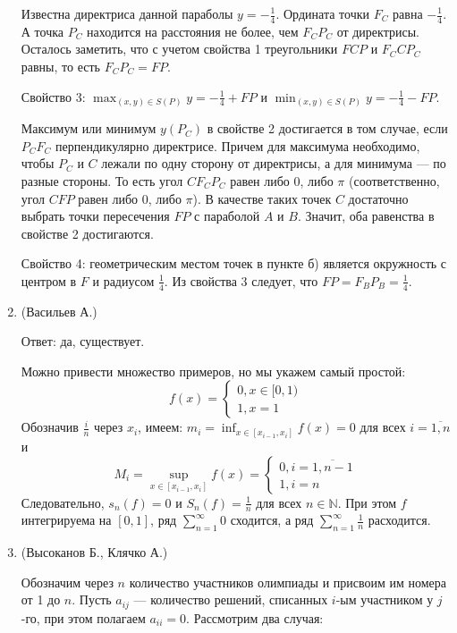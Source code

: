 \documentclass[12pt, a4paper]{article}
\begin{document}
\begin{enumerate}
Известна директриса данной параболы $y = -\frac{1}{4}$. Ордината точки $F_C$ равна $-\frac{1}{4}$. А точка $P_C$ находится на расстояния не более, чем $F_CP_C$ от директрисы. Осталось заметить, что с учетом свойства 1 треугольники $FCP$ и $F_CCP_C$ равны, то есть $F_CP_C = FP$.

Свойство 3:  $\displaystyle \max_{(x, y) \in S(P)} y = -\frac{1}{4} + FP$ и $\displaystyle \min_{(x, y) \in S(P)} y = -\frac{1}{4} - FP$. 

Максимум или минимум $y(P_C)$ в свойстве 2 достигается в том случае, если $P_CF_C$ перпендикулярно директрисе. Причем для максимума необходимо, чтобы $P_C$ и $C$ лежали по одну сторону от директрисы, а для минимума --- по разные стороны. То есть угол $CF_CP_C$ равен либо 0, либо $\pi$ (соответственно, угол $CFP$ равен либо 0, либо $\pi$). В качестве таких точек $C$ достаточно выбрать точки  пересечения $FP$ с параболой $A$ и $B$. Значит, оба равенства в свойстве 2 достигаются.

Свойство 4: геометрическим местом точек в пункте б) является окружность с центром в $F$ и радиусом $\frac{1}{4}$. Из свойства 3 следует, что $FP = F_BP_B = \frac{1}{4}$.

\item (Васильев А.)

Ответ: да, существует.

Можно привести множество примеров, но мы укажем самый простой:
$$
f(x) =
\begin{cases}
0, x \in [0, 1)\\
1, x = 1
\end{cases}
$$
Обозначив $\frac{i}{n}$ через $x_i$, имеем: $m_i = \inf_{x \in [x_{i-1}, x_i]} f(x) = 0$ для всех $i = \overline{1,n}$ и 
$$M_i = \sup_{x \in [x_{i-1}, x_i]} f(x) =\begin{cases} 
0, i = \overline{1, n-1} \\ 
1, i = n
\end{cases}
$$
Следовательно, $s_n(f) = 0$ и $S_n(f) = \frac{1}{n}$ для всех $n \in \mathbb{N}$. При этом $f$ интегрируема на $[0, 1]$, ряд $\displaystyle \sum_{n=1}^{\infty} 0$ сходится, а ряд $\displaystyle \sum_{n=1}^{\infty} \frac{1}{n}$ расходится.

\item (Высоканов Б., Клячко А.)

Обозначим через $n$ количество участников олимпиады и присвоим им номера от 1 до $n$. Пусть $a_{ij}$ --- количество решений, списанных $i$-ым участником у $j$-го, при этом полагаем $a_{ii} = 0$. Рассмотрим два случая:


\end{enumerate}
\end{document}
